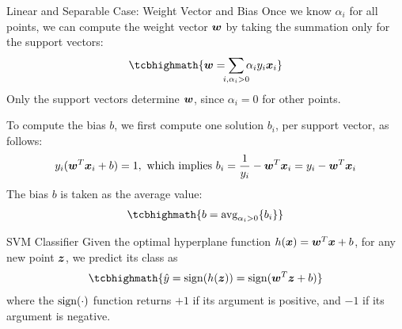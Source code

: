 \begin{frame}{Linear and Separable Case: Weight Vector and Bias}
Once we know $\alpha_i$ for all points, we can compute the weight
vector ${\boldsymbol w}$ by taking the
summation only for the support vectors:
\begin{align*}
\tcbhighmath{
    \bw = \dsum_{\mathclap{i, \alpha_i > 0}} \alpha_i y_i \bx_i
}
\end{align*}
Only the support vectors determine ${\boldsymbol w}$, since 
$\alpha_i=0$ for other points.

To compute the bias $b$, we f\/{i}rst compute one solution $b_i$, per
support vector, as follows:
\begin{align*}
  y_i ({\boldsymbol w}^T{\boldsymbol x}_i + b) = 1, \text{ which implies }
  b_i = {1 \over y_i} - {\boldsymbol w}^T{\boldsymbol x}_i = y_i - {\boldsymbol w}^T{\boldsymbol x}_i
\end{align*}
The bias $b$ is taken as the average value:
\begin{align*}
\tcbhighmath{
   b = \displaystyle \mbox{avg}_{\alpha_i > 0} \{ b_i\}
}
\end{align*}
\end{frame}



\begin{frame}{SVM Classif\/{i}er}
Given the optimal hyperplane function $h({\boldsymbol x}) = {\boldsymbol w}^T{\boldsymbol x} + b$,
for any new point ${\boldsymbol z}$, we predict its class as
\begin{align*}
\tcbhighmath{
  \hat{y}  =  \sign(h(\bz)) = \sign(\bw^T\bz + b)
}
\end{align*}
where the $\operatorname{sign}(\cdot)$ function returns $+1$ if its argument is positive, and
$-1$ if its argument is negative.
\end{frame}



